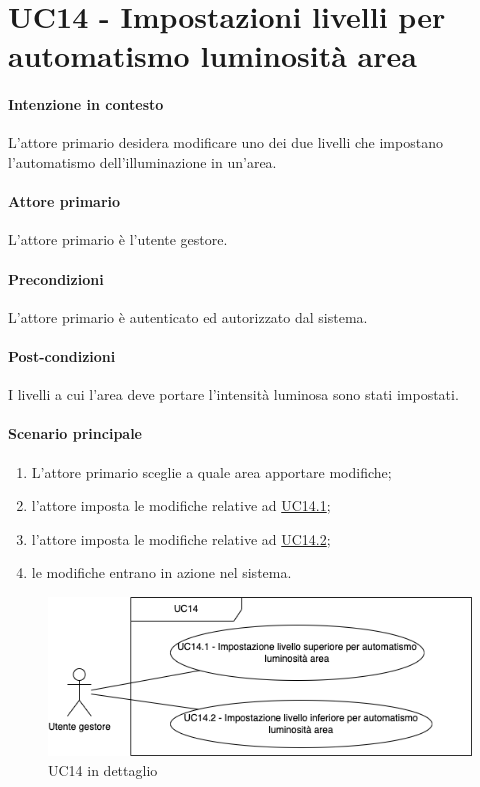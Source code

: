 \section{UC14 - Impostazioni livelli per automatismo luminosità area}\label{uc:14}
\paragraph{Intenzione in contesto} L'attore primario desidera modificare uno dei due livelli che impostano l'automatismo dell'illuminazione in un'area. 

\paragraph{Attore primario} L'attore primario è l'utente gestore.
\paragraph{Precondizioni} L'attore primario è autenticato ed autorizzato dal sistema.
\paragraph{Post-condizioni} I livelli a cui l'area deve portare l'intensità luminosa sono stati impostati.
\paragraph{Scenario principale}
\begin{enumerate}
    \item L'attore primario sceglie a quale area apportare modifiche;
    \item l'attore imposta le modifiche relative ad \hyperref[uc:14.1]{UC14.1};
    \item l'attore imposta le modifiche relative ad \hyperref[uc:14.2]{UC14.2};
    \item le modifiche entrano in azione nel sistema. 
\end{enumerate}

\begin{figure}[h]
    \includegraphics[width=\textwidth]{contenuti/img/casi_uso_grafici-uc14.png}
    \caption{UC14 in dettaglio}
    \label{fig:uc14}
\end{figure}

